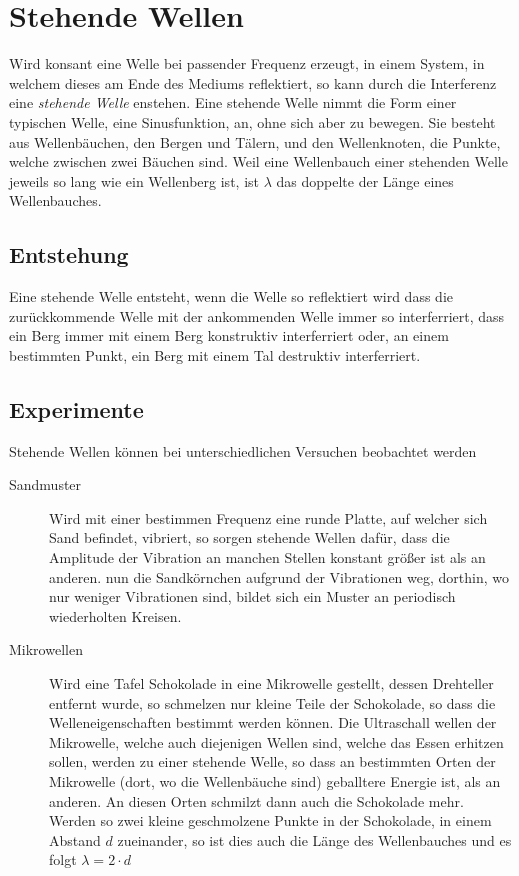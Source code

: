\documentclass{article}
\begin{document}
\section{Stehende Wellen} 
Wird konsant eine Welle bei passender Frequenz erzeugt, in einem System, in welchem dieses am Ende des Mediums reflektiert, so kann durch die Interferenz eine \emph{stehende Welle} enstehen. Eine stehende Welle nimmt die Form einer typischen Welle, eine Sinusfunktion, an, ohne sich aber zu bewegen.
Sie besteht aus Wellenbäuchen, den Bergen und Tälern, und den Wellenknoten, die Punkte, welche zwischen zwei Bäuchen sind. Weil eine Wellenbauch einer stehenden Welle jeweils so lang wie ein Wellenberg ist, ist $\lambda$ das doppelte der Länge eines Wellenbauches.  
 
\subsection{Entstehung}
Eine stehende Welle entsteht, wenn die Welle so reflektiert wird dass die zurückkommende Welle mit der ankommenden Welle immer so interferriert, dass ein Berg immer mit einem Berg konstruktiv interferriert oder, an einem bestimmten Punkt, ein Berg mit einem Tal destruktiv interferriert.
 
\subsection{Experimente}
Stehende Wellen können bei unterschiedlichen Versuchen beobachtet werden
\begin{description}
 \item[Sandmuster] Wird mit einer bestimmen Frequenz eine runde Platte, auf welcher sich Sand befindet, vibriert, so sorgen stehende Wellen dafür, dass die Amplitude der Vibration an manchen Stellen konstant größer ist als an anderen.  nun die Sandkörnchen aufgrund der Vibrationen weg, dorthin, wo nur weniger Vibrationen sind, bildet sich ein Muster an periodisch wiederholten Kreisen.
 \item[Mikrowellen] Wird eine Tafel Schokolade in eine Mikrowelle gestellt, dessen Drehteller entfernt wurde, so schmelzen nur kleine Teile der Schokolade, so dass die Welleneigenschaften bestimmt werden können. Die Ultraschall wellen der Mikrowelle, welche auch diejenigen Wellen sind, welche das Essen erhitzen sollen, werden zu einer stehende Welle, so dass an bestimmten Orten der Mikrowelle (dort, wo die Wellenbäuche sind) geballtere Energie ist, als an anderen. An diesen Orten schmilzt dann auch die Schokolade mehr. \newline 
Werden so zwei kleine geschmolzene Punkte in der Schokolade, in einem Abstand $d$ zueinander, so ist dies auch die Länge des Wellenbauches und es folgt $\lambda = 2 \cdot d$ 
\end{description} 
\end{document}
